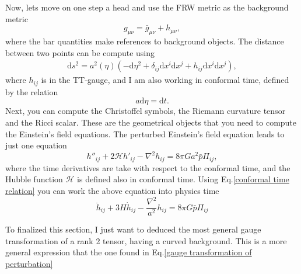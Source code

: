 \documentclass{article}
\begin{document}
Now, lets move on one step a head and use the FRW metric as the background metric
\begin{equation}
    g_{\mu\nu} = \bar{g}_{\mu\nu} + h_{\mu\nu},
\end{equation}
where the bar quantities make references to background objects. The distance between two
points can be compute using
\begin{align}
    \mathrm{d}s^{2} = a^{2}(\eta)\left(-\mathrm{d}\eta^2 
    + \delta_{ij}\mathrm{d}x^{i}\mathrm{d}x^{j}
    + h_{ij}\mathrm{d}x^{i}\mathrm{d}x^{j}\right),
\end{align}
where $h_{ij}$ is in the TT-gauge, and I am also working in conformal time, defined 
by the relation 
\begin{equation}
    \label{conformal time relation}
    a\mathrm{d}\eta = \mathrm{d}t.
\end{equation} 
Next, you can compute the Christoffel symbols, the Riemann curvature tensor and the 
Ricci scalar. These are the geometrical objects that you need to compute the Einstein's 
field equations. The perturbed Einstein's field equation leads to just one equation
\begin{equation}
    h''_{ij} + 2\mathcal{H}h'_{ij} - \nabla^{2}h_{ij} = 8\pi G a^{2}\bar{p}\Pi_{ij},
\end{equation}
where the time derivatives are take with respect to the conformal time, and the Hubble function
$\mathcal{H}$ is defined also in conformal time. Using Eq.\eqref{conformal time relation} you can
work the above equation into physics time
\begin{equation}
    \ddot{h}_{ij} + 3H\dot{h}_{ij} - \frac{\nabla^{2}}{a^{2}}h_{ij} = 8\pi G \bar{p}\Pi_{ij}
\end{equation}

To finalized this section, I just want to deduced the most general gauge transformation
of a rank 2 tensor, having a curved background. This is a more general expression that the one
found in Eq.\eqref{gauge transformation of perturbation}




\end{document}
